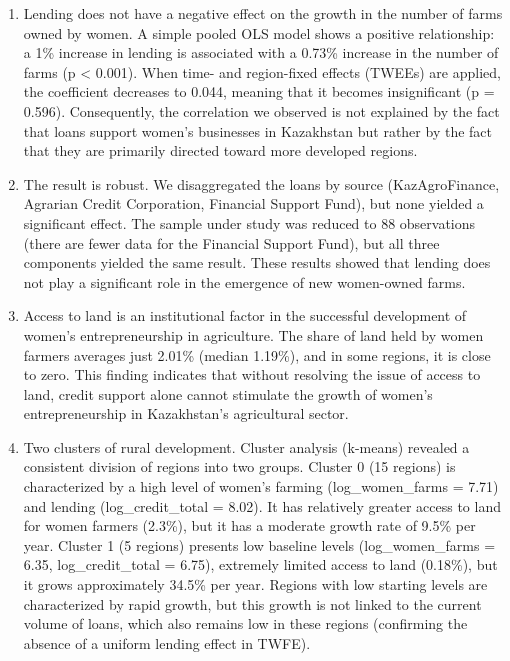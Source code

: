 ﻿\documentclass[pdflatex,sn-mathphys-ay]{sn-jnl}
\begin{document}
\begin{enumerate}
\item Lending does not have a negative effect on the growth in the number
of farms owned by women. A simple pooled OLS model shows a positive
relationship: a 1\% increase in lending is associated with a 0.73\%
increase in the number of farms (p \textless{} 0.001). When time- and
region-fixed effects (TWEEs) are applied, the coefficient decreases to
0.044, meaning that it becomes insignificant (p = 0.596). Consequently,
the correlation we observed is not explained by the fact that loans
support women's businesses in Kazakhstan but rather by the fact that they are
primarily directed toward more developed regions.

\item The result is robust. We disaggregated the loans by source
(KazAgroFinance, Agrarian Credit Corporation, Financial Support Fund),
but none yielded a significant effect. The sample under study was
reduced to 88 observations (there are fewer data for the Financial Support
Fund), but all three components yielded the same result. These results
showed that lending does not play a significant role in the emergence of
new women-owned farms.

\item Access to land is an institutional factor in the successful
development of women's entrepreneurship in agriculture. The share of
land held by women farmers averages just 2.01\% (median 1.19\%), and in
some regions, it is close to zero. This finding indicates that without
resolving the issue of access to land, credit support alone cannot
stimulate the growth of women's entrepreneurship in Kazakhstan's
agricultural sector.

\item Two clusters of rural development.
Cluster analysis (k-means) revealed a consistent division of regions
into two groups. Cluster 0 (15 regions) is characterized by a high
level of women's farming (log\_women\_farms = 7.71) and lending
(log\_credit\_total = 8.02). It has relatively greater access to land
for women farmers (2.3\%), but it has a moderate growth rate of 9.5\%
per year. Cluster 1 (5 regions) presents low baseline levels
(log\_women\_farms = 6.35, log\_credit\_total = 6.75), extremely
limited access to land (0.18\%), but it grows approximately 34.5\% per
year. Regions with low starting levels are characterized by rapid
growth, but this growth is not linked to the current volume of loans,
which also remains low in these regions (confirming the absence of a
uniform lending effect in TWFE).


\end{enumerate}
\end{document}
